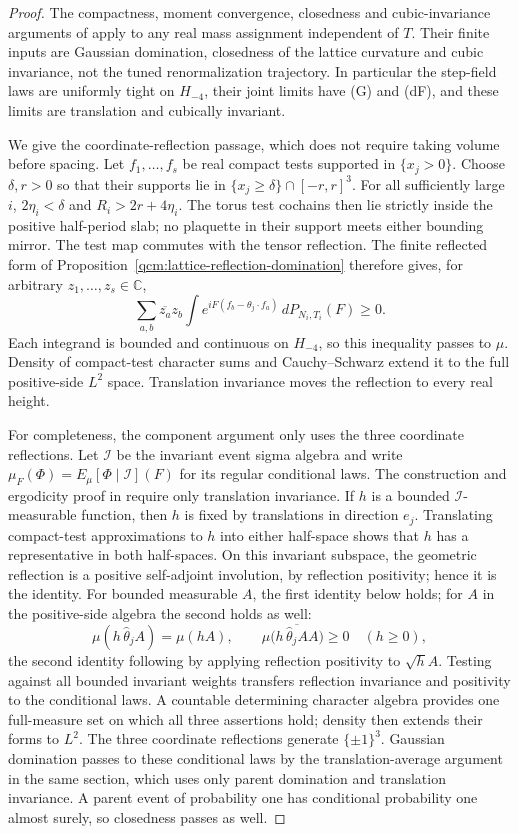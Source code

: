 \documentclass[11pt,letterpaper,reqno]{amsart}
\theoremstyle{definition}
\begin{document}
\begin{proof}
The compactness, moment convergence, closedness and cubic-invariance
arguments of \cite[Sections~6.1--6.3]{QEDConstruction} apply to any
real mass assignment independent of $T$. Their finite inputs are
Gaussian domination, closedness of the lattice curvature and cubic
invariance, not the tuned renormalization trajectory. In particular
the step-field laws are uniformly tight on $H_{-4}$, their joint
limits have \textup{(G)} and \textup{(dF)}, and these limits are
translation and cubically invariant.

We give the coordinate-reflection passage, which does not require
taking volume before spacing. Let $f_1,\ldots,f_s$ be real compact
tests supported in $\{x_j>0\}$. Choose $\delta,r>0$ so that their
supports lie in $\{x_j\ge\delta\}\cap[-r,r]^3$. For all sufficiently
large $i$, $2\eta_i<\delta$ and $R_i>2r+4\eta_i$. The torus test
cochains then lie strictly inside the positive half-period slab;
no plaquette in their support meets either bounding mirror. The
test map commutes with the tensor reflection. The finite reflected
form of Proposition~\ref{qcm:lattice-reflection-domination} therefore
gives, for arbitrary $z_1,\ldots,z_s\in\mathbb C$,
\[
 \sum_{a,b}\overline{z_a}z_b\int
       e^{iF(f_b-\theta_j\cdot f_a)}\,dP_{N_i,T_i}(F)\ge0.
\]
Each integrand is bounded and continuous on $H_{-4}$, so this
inequality passes to $\mu$. Density of compact-test character sums
and Cauchy--Schwarz extend it to the full positive-side $L^2$ space.
Translation invariance moves the reflection to every real height.

For completeness, the component argument only uses the three
coordinate reflections. Let $\mathcal I$ be the invariant event
sigma algebra and write $\mu_F(\Phi)=E_\mu[\Phi\mid\mathcal I](F)$
for its regular conditional laws. The construction and ergodicity
proof in \cite[Section~7.5]{QEDConstruction} require only translation
invariance. If $h$ is a bounded $\mathcal I$-measurable function,
then $h$ is fixed by translations in direction $e_j$. Translating
compact-test approximations to $h$ into either half-space shows
that $h$ has a representative in both half-spaces. On this invariant
subspace, the geometric reflection is a positive self-adjoint
involution, by reflection positivity; hence it is the identity.
For bounded measurable $A$, the first identity below holds; for
$A$ in the positive-side algebra the second holds as well:
\[
 \mu(h\,\hat\theta_j A)=\mu(hA),\qquad
 \mu\bigl(h\,\overline{\hat\theta_j A}A\bigr)\ge0\quad(h\ge0),
\]
the second identity following by applying reflection positivity to
$\sqrt hA$. Testing against all bounded invariant weights transfers
reflection invariance and positivity to the conditional laws.
A countable determining character algebra provides one full-measure
set on which all three assertions hold; density then extends their
forms to $L^2$. The three coordinate reflections generate
$\{\pm1\}^3$. Gaussian domination passes to these conditional laws
by the translation-average argument in the same section, which uses
only parent domination and translation invariance. A parent event
of probability one has conditional probability one almost surely,
so closedness passes as well.


\end{proof}
\end{document}
